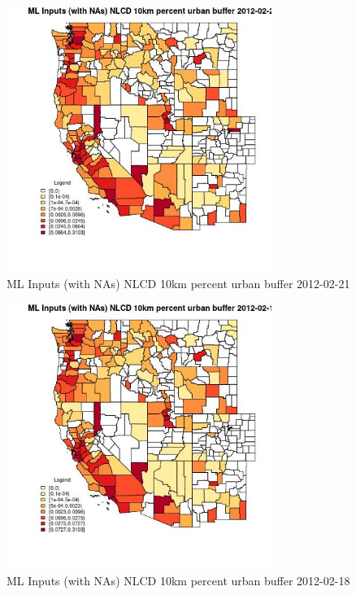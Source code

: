 \begin{figure} 
\centering  
\includegraphics[width=0.77\textwidth]{Code_Outputs/Report_ML_input_PM25_Step4_part_f_de_duplicated_aves_prioritize_24hr_obswNAs_CountyNLCD_10km_percent_urban_bufferMean2012-02-21.jpg} 
\caption{\label{fig:Report_ML_input_PM25_Step4_part_f_de_duplicated_aves_prioritize_24hr_obswNAsCountyNLCD_10km_percent_urban_bufferMean2012-02-21}ML Inputs (with NAs) NLCD 10km percent urban buffer 2012-02-21} 
\end{figure} 
 

\begin{figure} 
\centering  
\includegraphics[width=0.77\textwidth]{Code_Outputs/Report_ML_input_PM25_Step4_part_f_de_duplicated_aves_prioritize_24hr_obswNAs_CountyNLCD_10km_percent_urban_bufferMean2012-02-18.jpg} 
\caption{\label{fig:Report_ML_input_PM25_Step4_part_f_de_duplicated_aves_prioritize_24hr_obswNAsCountyNLCD_10km_percent_urban_bufferMean2012-02-18}ML Inputs (with NAs) NLCD 10km percent urban buffer 2012-02-18} 
\end{figure} 
 

